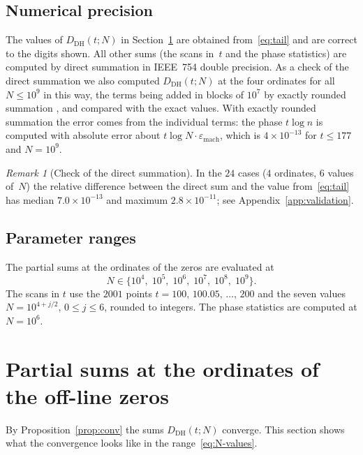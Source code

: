 \documentclass[11pt]{amsart}
\theoremstyle{definition}
\theoremstyle{remark}
\newtheorem{remark}[theorem]{Remark}
\renewcommand{\DH}{\mathrm{DH}}
\begin{document}
\subsection{Numerical precision}\label{ssec:precision}

The values of $D_{\DH}(t;N)$ in Section~\ref{sec:results} are obtained
from~\eqref{eq:tail} and are correct to the digits shown.  All other sums
(the scans in~$t$ and the phase statistics) are computed by direct
summation in IEEE~754 double precision.  As a check of the direct
summation we also computed $D_{\DH}(t;N)$ at the four ordinates for all
$N\le10^9$ in this way, the terms being added in blocks of $10^7$ by
exactly rounded summation \cite{Shewchuk1997}, and compared with the exact
values.  With exactly rounded summation the error comes from the
individual terms: the phase $t\log n$ is computed with absolute error
about $t\log N\cdot\varepsilon_{\mathrm{mach}}$, which is $4\times10^{-13}$
for $t\le177$ and $N=10^9$.

\begin{remark}[Check of the direct summation]\label{rem:validation}
In the $24$ cases ($4$ ordinates, $6$ values of~$N$) the relative
difference between the direct sum and the value from~\eqref{eq:tail} has
median $7.0\times10^{-13}$ and maximum $2.8\times10^{-11}$; see Appendix~\ref{app:validation}.
\end{remark}

\subsection{Parameter ranges}

The partial sums at the ordinates of the zeros are evaluated at
\begin{equation}\label{eq:N-values}
  N \in \{10^4,\; 10^5,\; 10^6,\; 10^7,\; 10^8,\; 10^9\}.
\end{equation}
The scans in $t$ use the $2001$ points $t=100,\,100.05,\,\dots,\,200$ and
the seven values $N=10^{4+j/2}$, $0\le j\le6$, rounded to integers.  The
phase statistics are computed at $N=10^6$.

\section{Partial sums at the ordinates of the off-line zeros}\label{sec:results}

By Proposition~\ref{prop:conv} the sums $D_{\DH}(t;N)$ converge.  This
section shows what the convergence looks like in the range~\eqref{eq:N-values}.
\end{document}
